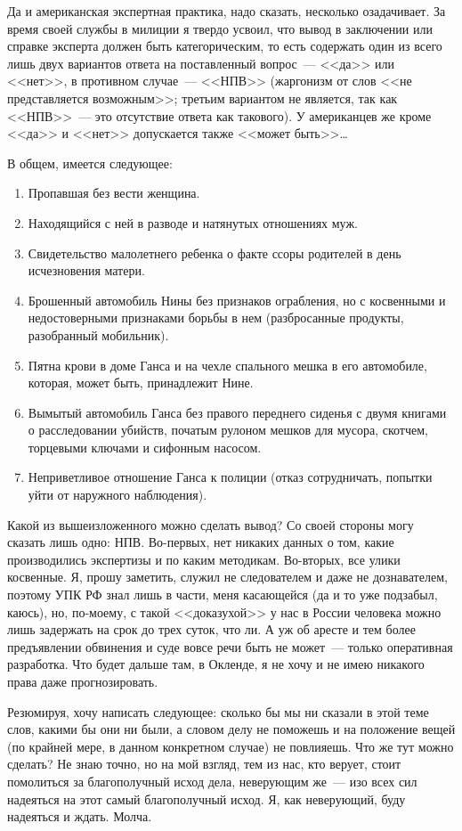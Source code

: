 Да и американская экспертная практика, надо сказать, несколько озадачивает. За время своей службы в милиции я твердо усвоил, что вывод в заключении или справке эксперта должен быть категорическим, то есть содержать один из всего лишь двух вариантов ответа на поставленный вопрос~--- <<да>> или <<нет>>, в противном случае~--- <<НПВ>> (жаргонизм от слов <<не представляется возможным>>; третьим вариантом не является, так как <<НПВ>>~--- это отсутствие ответа как такового). У американцев же кроме <<да>> и <<нет>> допускается также <<может быть>>\dots 

В общем, имеется следующее: 

\begin{enumerate}
	\item Пропавшая без вести женщина. 
	\item Находящийся с ней в разводе и натянутых отношениях муж. 
	\item Свидетельство малолетнего ребенка о факте ссоры родителей в день исчезновения матери. 
	\item Брошенный автомобиль Нины без признаков ограбления, но с косвенными и недостоверными признаками борьбы в нем (разбросанные продукты, разобранный мобильник). 
	\item Пятна крови в доме Ганса и на чехле спального мешка в его автомобиле, которая, может быть, принадлежит Нине. 
	\item Вымытый автомобиль Ганса без правого переднего сиденья с двумя книгами о расследовании убийств, початым рулоном мешков для мусора, скотчем, торцевыми ключами и сифонным насосом.
	\item Неприветливое отношение Ганса к полиции (отказ сотрудничать, попытки уйти от наружного наблюдения). 
\end{enumerate}


Какой из вышеизложенного можно сделать вывод? Со своей стороны могу сказать лишь одно: НПВ. Во-первых, нет никаких данных о том, какие производились экспертизы и по каким методикам. Во-вторых, все улики косвенные. Я, прошу заметить, служил не следователем и даже не дознавателем, поэтому УПК РФ знал лишь в части, меня касающейся (да и то уже подзабыл, каюсь), но, по-моему, с такой <<доказухой>> у нас в России человека можно лишь задержать на срок до трех суток, что ли. А уж об аресте и тем более предъявлении обвинения и суде вовсе речи быть не может~--- только оперативная разработка. Что будет дальше там, в Окленде, я не хочу и не имею никакого права даже прогнозировать. 

Резюмируя, хочу написать следующее: сколько бы мы ни сказали в этой теме слов, какими бы они ни были, а словом делу не поможешь и на положение вещей (по крайней мере, в данном конкретном случае) не повлияешь. Что же тут можно сделать? Не знаю точно, но на мой взгляд, тем из нас, кто верует, стоит помолиться за благополучный исход дела, неверующим же~--- изо всех сил надеяться на этот самый благополучный исход. Я, как неверующий, буду надеяться и ждать. Молча. 

